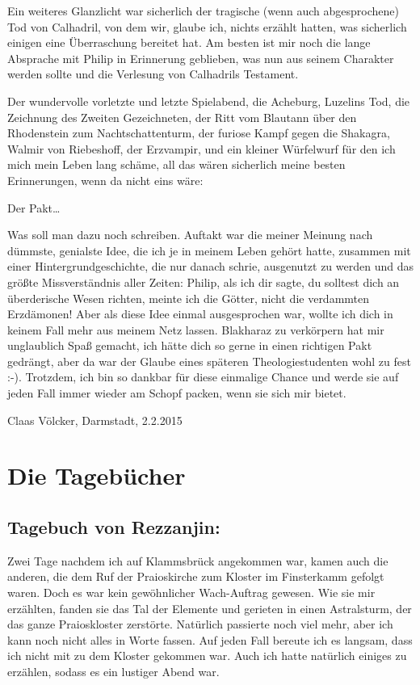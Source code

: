 Ein weiteres Glanzlicht war sicherlich der tragische (wenn auch abgesprochene) Tod von Calhadril, von dem wir, glaube ich, nichts erzählt hatten, was sicherlich einigen eine Überraschung bereitet hat. Am besten ist mir noch die lange Absprache mit Philip in Erinnerung geblieben, was nun aus seinem Charakter werden sollte und die Verlesung von Calhadrils Testament.\par
Der wundervolle vorletzte und letzte Spielabend, die Acheburg, Luzelins Tod, die Zeichnung des Zweiten Gezeichneten, der Ritt vom Blautann über den Rhodenstein zum Nachtschattenturm, der furiose Kampf gegen die Shakagra, Walmir von Riebeshoff, der Erzvampir, und ein kleiner Würfelwurf für den ich mich mein Leben lang schäme, all das wären sicherlich meine besten Erinnerungen, wenn da nicht eins wäre:\par\bigskip

Der Pakt\dots\par
Was soll man dazu noch schreiben. Auftakt war die meiner Meinung nach dümmste, genialste Idee, die ich je in meinem Leben gehört hatte, zusammen mit einer Hintergrundgeschichte, die nur danach schrie, ausgenutzt zu werden und das größte Missverständnis aller Zeiten: Philip, als ich dir sagte, du solltest dich an überderische Wesen richten, meinte ich die Götter, nicht die verdammten Erzdämonen! Aber als diese Idee einmal ausgesprochen war, wollte ich dich in keinem Fall mehr aus meinem Netz lassen. Blakharaz zu verkörpern hat mir unglaublich Spaß gemacht, ich hätte dich so gerne in einen richtigen Pakt gedrängt, aber da war der Glaube eines späteren Theologiestudenten wohl zu fest :-). Trotzdem, ich bin so dankbar für diese einmalige Chance und werde sie auf jeden Fall immer wieder am Schopf packen, wenn sie sich mir bietet.

\begin{flushright}
Claas Völcker, Darmstadt, 2.2.2015
\end{flushright}



 
 
\section{Die Tagebücher}


\subsection{Tagebuch von Rezzanjin:}

Zwei Tage nachdem ich auf Klammsbrück angekommen war, kamen auch die anderen, die dem Ruf der Praioskirche zum Kloster im Finsterkamm gefolgt waren. Doch es war kein gewöhnlicher Wach-Auftrag gewesen. Wie sie mir erzählten, fanden sie das Tal der Elemente und gerieten in einen Astralsturm, der das ganze Praioskloster zerstörte. Natürlich passierte noch viel mehr, aber ich kann noch nicht alles in Worte fassen. Auf jeden Fall bereute ich es langsam, dass ich nicht mit zu dem Kloster gekommen war. Auch ich hatte natürlich einiges zu erzählen, sodass es ein lustiger Abend war.\par

